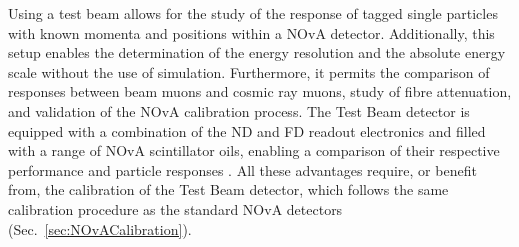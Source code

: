 Using a test beam allows for the study of the response of tagged single particles with known momenta and positions within a \gls{NOvA} detector. Additionally, this setup enables the determination of the energy resolution and the absolute energy scale without the use of simulation. Furthermore, it permits the comparison of responses between beam muons and cosmic ray muons, study of fibre attenuation, and validation of the \gls{NOvA} calibration process. The Test Beam detector is equipped with a combination of the \gls{ND} and \gls{FD} readout electronics and filled with a range of \gls{NOvA} scintillator oils, enabling a comparison of their respective performance and particle responses \cite{NOvA-doc-15750}. All these advantages require, or benefit from, the calibration of the Test Beam detector, which follows the same calibration procedure as the standard \gls{NOvA} detectors (Sec.~\ref{sec:NOvACalibration}).


